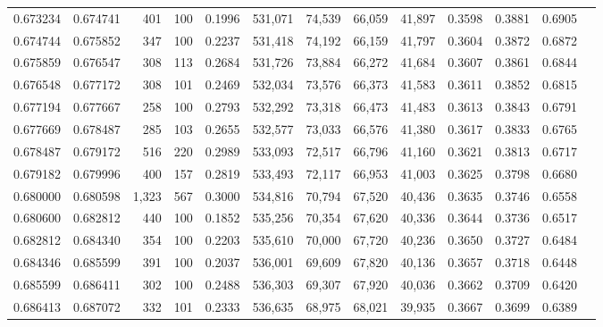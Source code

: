 \begin{tabular}{rrrrrrrrrrrrr}
0.673234 & 0.674741 &   401 & 100 &                                     0.1996 & 531,071 &  74,539 &  66,059 &  41,897 & 0.3598 & 0.3881 & 0.6905 \\
0.674744 & 0.675852 &   347 & 100 &                                     0.2237 & 531,418 &  74,192 &  66,159 &  41,797 & 0.3604 & 0.3872 & 0.6872 \\
0.675859 & 0.676547 &   308 & 113 &                                     0.2684 & 531,726 &  73,884 &  66,272 &  41,684 & 0.3607 & 0.3861 & 0.6844 \\
0.676548 & 0.677172 &   308 & 101 &                                     0.2469 & 532,034 &  73,576 &  66,373 &  41,583 & 0.3611 & 0.3852 & 0.6815 \\
0.677194 & 0.677667 &   258 & 100 &                                     0.2793 & 532,292 &  73,318 &  66,473 &  41,483 & 0.3613 & 0.3843 & 0.6791 \\
0.677669 & 0.678487 &   285 & 103 &                                     0.2655 & 532,577 &  73,033 &  66,576 &  41,380 & 0.3617 & 0.3833 & 0.6765 \\
0.678487 & 0.679172 &   516 & 220 &                                     0.2989 & 533,093 &  72,517 &  66,796 &  41,160 & 0.3621 & 0.3813 & 0.6717 \\
0.679182 & 0.679996 &   400 & 157 &                                     0.2819 & 533,493 &  72,117 &  66,953 &  41,003 & 0.3625 & 0.3798 & 0.6680 \\
0.680000 & 0.680598 & 1,323 & 567 &                                     0.3000 & 534,816 &  70,794 &  67,520 &  40,436 & 0.3635 & 0.3746 & 0.6558 \\
0.680600 & 0.682812 &   440 & 100 &                                     0.1852 & 535,256 &  70,354 &  67,620 &  40,336 & 0.3644 & 0.3736 & 0.6517 \\
0.682812 & 0.684340 &   354 & 100 &                                     0.2203 & 535,610 &  70,000 &  67,720 &  40,236 & 0.3650 & 0.3727 & 0.6484 \\
0.684346 & 0.685599 &   391 & 100 &                                     0.2037 & 536,001 &  69,609 &  67,820 &  40,136 & 0.3657 & 0.3718 & 0.6448 \\
0.685599 & 0.686411 &   302 & 100 &                                     0.2488 & 536,303 &  69,307 &  67,920 &  40,036 & 0.3662 & 0.3709 & 0.6420 \\
0.686413 & 0.687072 &   332 & 101 &                                     0.2333 & 536,635 &  68,975 &  68,021 &  39,935 & 0.3667 & 0.3699 & 0.6389 \\

\end{tabular}
